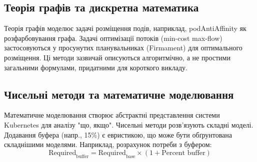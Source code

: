\subsection{Теорія графів та дискретна математика}
Теорія графів моделює задачі розміщення подів, наприклад, podAntiAffinity як розфарбовування графа. Задачі оптимізації потоків (min-cost max-flow) застосовуються у просунутих планувальниках (Firmament) для оптимального розміщення. Ці методи зазвичай описуються алгоритмічно, а не простими загальними формулами, придатними для короткого викладу.

\subsection{Чисельні методи та математичне моделювання}
Математичне моделювання створює абстрактні представлення системи Kubernetes для аналізу "що, якщо". Чисельні методи розв'язують складні моделі. Додавання буфера (напр., 15\%) є евристикою, що може бути обґрунтована складнішими моделями. Наприклад, розрахунок потреби з буфером:
$$ \text{Required}_{\text{buffer}} = \text{Required}_{\text{base}} \times (1 + \text{Percent buffer}) $$